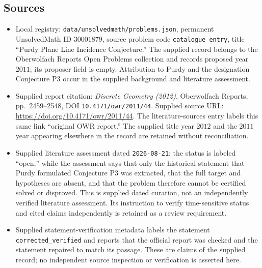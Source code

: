 \documentclass[11pt]{article}
\begin{document}
\subsection{Sources}
\begin{itemize}
\item Local registry: \texttt{data/unsolvedmath/problems.json}, permanent UnsolvedMath ID \(30001879\), source problem code \texttt{catalogue entry}, title ``Purdy Plane Line Incidence Conjecture.'' The supplied record belongs to the Oberwolfach Reports Open Problems collection and records proposed year \(2011\); its proposer field is empty. Attribution to Purdy and the designation Conjecture P3 occur in the supplied background and literature assessment.
\item Supplied report citation: \emph{Discrete Geometry (2012)}, Oberwolfach Reports, pp.\ 2459--2548, DOI \texttt{10.4171/owr/2011/44}. Supplied source URL: \url{https://doi.org/10.4171/owr/2011/44}. The literature-sources entry labels this same link ``original OWR report.'' The supplied title year \(2012\) and the \(2011\) year appearing elsewhere in the record are retained without reconciliation.
\item Supplied literature assessment dated \texttt{2026-08-21}: the status is labeled ``open,'' while the assessment says that only the historical statement that Purdy formulated Conjecture P3 was extracted, that the full target and hypotheses are absent, and that the problem therefore cannot be certified solved or disproved. This is supplied dated curation, not an independently verified literature assessment. Its instruction to verify time-sensitive status and cited claims independently is retained as a review requirement.
\item Supplied statement-verification metadata labels the statement \texttt{corrected\_verified} and reports that the official report was checked and the statement repaired to match its passage. These are claims of the supplied record; no independent source inspection or verification is asserted here.
\end{itemize}
\end{document}
